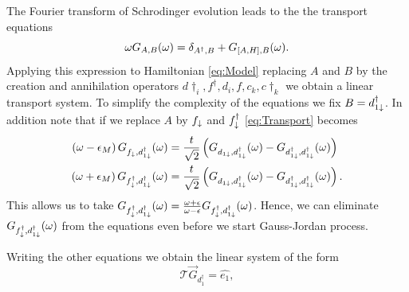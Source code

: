 \documentclass[showpacs,aps,prb,reprint,superscriptaddress]{revtex4-1}
\begin{document}
The Fourier transform of Schrodinger evolution leads to the the transport equations 
\begin{equation}
    \omega G_{A,B}(\omega)=\delta_{A^{\dagger},B}+G_{\left[A,H\right],B}(\omega).
    \label{eq:Transport}
\end{equation}
\noindent Applying this expression to Hamiltonian \eqref{eq:Model} replacing $A$ and $B$ by the creation and annihilation operators $d\dagger_i, f^\dagger, d_i,f ,c_k,c\dagger_k$ we obtain a linear transport system. To simplify the complexity of the equations we fix $B = d^\dagger_{1\downarrow}$. In addition note that if we replace $A$ by $f_\downarrow$ and $f^\dagger_\downarrow$ \ref{eq:Transport} becomes
\begin{align}
        \left(\omega-\epsilon_{M}\right)G_{f_{\downarrow},d_{1\downarrow}^{\dagger}}(\omega)&=\frac{t}{\sqrt{2}}\left(G_{d_{1\downarrow},d_{1\downarrow}^{\dagger}}(\omega)-G_{d_{1\downarrow}^{\dagger},d_{1\downarrow}^{\dagger}}(\omega)\right) \\
    \left(\omega+\epsilon_{M}\right)G_{f_{\downarrow}^{\dagger},d_{1\downarrow}^{\dagger}}(\omega)&=\frac{t}{\sqrt{2}}\left(G_{d_{1\downarrow},d_{1\downarrow}^{\dagger}}(\omega)-G_{d_{1\downarrow}^{\dagger},d_{1\downarrow}^{\dagger}}(\omega)\right).
\end{align}
\noindent This allows us to take $G_{f_{\downarrow}^{\dagger},d_{1\downarrow}^{\dagger}}(\omega) = \frac{\omega + \epsilon}{\omega -\epsilon}G_{f_{\downarrow}^{\dagger},d_{1\downarrow}^{\dagger}}(\omega) $. Hence, we can eliminate $G_{f_{\downarrow}^{\dagger},d_{1\downarrow}^{\dagger}}(\omega) $ from the equations even before we start Gauss-Jordan process.

Writing the other equations  we obtain the  linear system of the form
\begin{equation}
    \mathcal{T} \vec{G}_{d^\dagger_1} = \hat{e_1},
\end{equation}
\end{document}
